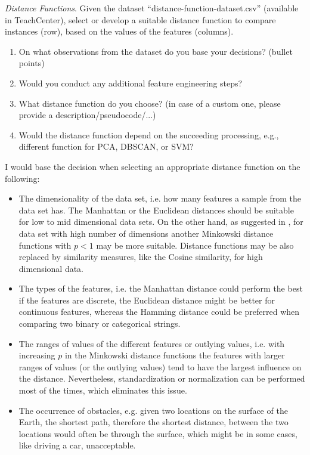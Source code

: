 \documentclass[a4paper,10pt]{article}\setlength{\textheight}{10in}\setlength{\textwidth}{6.5in}\setlength{\topmargin}{-0.125in}\setlength{\oddsidemargin}{-.2in}\setlength{\evensidemargin}{-.2in}\setlength{\headsep}{0.2in}\setlength{\footskip}{0pt}\usepackage{amsmath}\usepackage{fancyhdr}\usepackage{enumitem}\usepackage{hyperref}\usepackage{xcolor}\usepackage{graphicx}\pagestyle{fancy}
\begin{document}
\begin{enumerate}[topsep=0mm, partopsep=0mm, leftmargin=*]

{\color{blue}
\item\textit{Distance Functions}. Given the dataset ``distance-function-dataset.csv'' (available in TeachCenter), select or develop a suitable distance function to compare instances (row), based on the values of the features (columns).
\begin{enumerate}
	\item On what observations from the dataset do you base your decisions? (bullet points)
	\item Would you conduct any additional feature engineering steps?
	\item What distance function do you choose? (in case of a custom one, please provide a description/pseudocode/...)
	\item Would the distance function depend on the succeeding processing, e.g., different function for PCA, DBSCAN, or SVM?
\end{enumerate}
}

I would base the decision when selecting an appropriate distance function on the following:
\begin{itemize}
    \item The dimensionality of the data set, i.e. how many features a sample from the data set has. The Manhattan or the Euclidean distances should be suitable for low to mid dimensional data sets. On the other hand, as suggested in \cite{distMetrics}, for data set with high number of dimensions another Minkowski distance functions with $p < 1$ may be more suitable. Distance functions may be also replaced by similarity measures, like the Cosine similarity, for high dimensional data.
    \item The types of the features, i.e. the Manhattan distance could perform the best if the features are discrete, the Euclidean distance might be better for continuous features, whereas the Hamming distance could be preferred when comparing two binary or categorical strings. 
    \item The ranges of values of the different features or outlying values, i.e. with increasing $p$ in the Minkowski distance functions the features with larger ranges of values (or the outlying values) tend to have the largest influence on the distance. Nevertheless, standardization or normalization can be performed most of the times, which eliminates this issue. 
    \item The occurrence of obstacles, e.g. given two locations on the surface of the Earth, the shortest path, therefore the shortest distance, between the two locations would often be through the surface, which might be in some cases, like driving a car, unacceptable. 
\end{itemize}


\end{enumerate}
\end{document}

